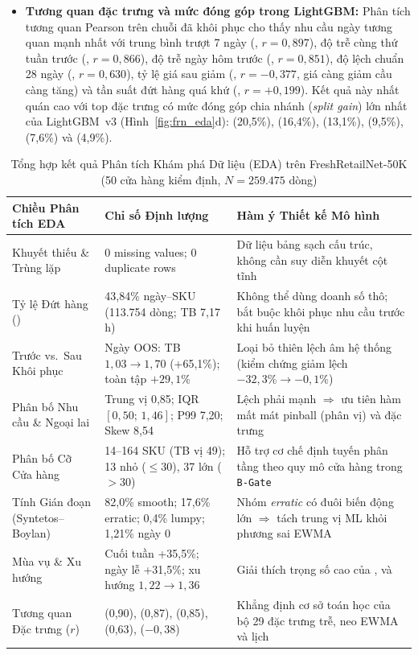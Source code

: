 \begin{itemize}
    \item \textbf{Tương quan đặc trưng và mức đóng góp trong LightGBM:} Phân tích tương quan Pearson trên chuỗi đã khôi phục cho thấy nhu cầu ngày tương quan mạnh nhất với trung bình trượt 7 ngày (, $r = 0{,}897$), độ trễ cùng thứ tuần trước (, $r = 0{,}866$), độ trễ ngày hôm trước (, $r = 0{,}851$), độ lệch chuẩn 28 ngày (, $r = 0{,}630$), tỷ lệ giá sau giảm (, $r = -0{,}377$, giá càng giảm cầu càng tăng) và tần suất đứt hàng quá khứ (, $r = +0{,}199$). Kết quả này nhất quán cao với top đặc trưng có mức đóng góp chia nhánh (\emph{split gain}) lớn nhất của LightGBM~v3 (Hình~\ref{fig:frn_eda}d):  (20,5\%),  (16,4\%),  (13,1\%),  (9,5\%),  (7,6\%) và  (4,9\%).
\end{itemize}

\begin{table}[H]
\centering
\caption{Tổng hợp kết quả Phân tích Khám phá Dữ liệu (EDA) trên FreshRetailNet-50K (50 cửa hàng kiểm định, $N = 259.475$ dòng)}
\label{tab:frn_eda_summary}
\footnotesize
\begin{tabularx}{\textwidth}{L{4.2cm} L{4.2cm} Y}
\toprule
\textbf{Chiều Phân tích EDA} & \textbf{Chỉ số Định lượng} & \textbf{Hàm ý Thiết kế Mô hình} \\
\midrule
Khuyết thiếu \& Trùng lặp & 0 missing values; 0 duplicate rows & Dữ liệu bảng sạch cấu trúc, không cần suy diễn khuyết cột tĩnh \\
Tỷ lệ Đứt hàng () & 43,84\% ngày--SKU (113.754 dòng; TB 7,17\,h) & Không thể dùng doanh số thô; bắt buộc khôi phục nhu cầu trước khi huấn luyện \\
Trước vs.\ Sau Khôi phục & Ngày OOS: TB $1{,}03 \to 1{,}70$ (+65,1\%); toàn tập $+29{,}1\%$ & Loại bỏ thiên lệch âm hệ thống (kiểm chứng giảm lệch $-32{,}3\% \to -0{,}1\%$) \\
Phân bố Nhu cầu \& Ngoại lai & Trung vị 0,85; IQR $[0{,}50;\,1{,}46]$; P99 7,20; Skew 8,54 & Lệch phải mạnh $\Rightarrow$ ưu tiên hàm mất mát pinball (phân vị) và đặc trưng  \\
Phân bố Cỡ Cửa hàng & 14--164 SKU (TB vị 49); 13 nhỏ ($\le 30$), 37 lớn ($>30$) & Hỗ trợ cơ chế định tuyến phân tầng theo quy mô cửa hàng trong \texttt{B-Gate} \\
Tính Gián đoạn (Syntetos--Boylan) & 82,0\% smooth; 17,6\% erratic; 0,4\% lumpy; 1,21\% ngày 0 & Nhóm \emph{erratic} có đuôi biến động lớn $\Rightarrow$ tách trung vị ML khỏi phương sai EWMA \\
Mùa vụ \& Xu hướng & Cuối tuần +35,5\%; ngày lễ +31,5\%; xu hướng $1{,}22 \to 1{,}36$ & Giải thích trọng số cao của ,  và  \\
Tương quan Đặc trưng ($r$) &  (0,90),  (0,87),  (0,85),  (0,63),  ($-0{,}38$) & Khẳng định cơ sở toán học của bộ 29 đặc trưng trễ, neo EWMA và lịch \\
\bottomrule
\end{tabularx}
\end{table}

